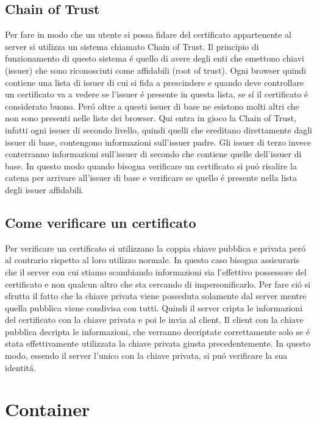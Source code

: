 \subsection{Chain of Trust}
Per fare in modo che un utente si possa fidare del certificato appartenente al server si utilizza un sistema chiamato Chain of Trust. Il principio di funzionamento di questo sistema é quello di avere degli enti che emettono chiavi (issuer) che sono riconosciuti come affidabili (root of trust). Ogni browser quindi contiene una lista di issuer di cui si fida a prescindere e quando deve controllare un certificato va a vedere se l'issuer é presente in questa lista, se sí il certificato é considerato buono. Peró oltre a questi issuer di base ne esistono molti altri che non sono presenti nelle liste dei browser. Qui entra in gioco la Chain of Trust, infatti ogni issuer di secondo livello, quindi quelli che ereditano direttamente dagli issuer di base, contengono informazioni sull'issuer padre. Gli issuer di terzo invece conterranno informazioni sull'issuer di secondo che contiene quelle dell'issuer di base. In questo modo quando bisogna verificare un certificato si puó risalire la catena per arrivare all'issuer di base e verificare se quello é presente nella lista degli issuer affidabili.

\subsection{Come verificare un certificato}
Per verificare un certificato si utilizzano la coppia chiave pubblica e privata peró al contrario rispetto al loro utilizzo normale. In questo caso bisogna assicuraris che il server con cui stiamo scambiando informazioni sia l'effettivo possessore del certificato e non qualcun altro che sta cercando di impersonificarlo. Per fare ció si sfrutta il fatto che la chiave privata viene posseduta solamente dal server mentre quella pubblica viene condivisa con tutti. Quindi il server cripta le informazioni del certificato con la chiave privata e poi le invia al client. Il client con la chiave pubblica decripta le informazioni, che verranno decriptate correttamente solo se é stata effettivamente utilizzata la chiave privata giusta precedentemente. In questo modo, essendo il server l'unico con la chiave privata, si puó verificare la sua identitá.

\section{Container}
